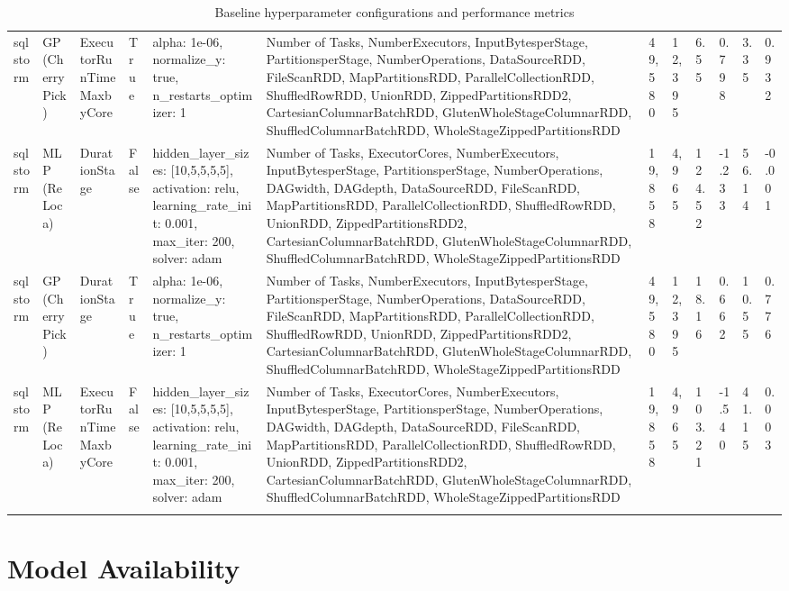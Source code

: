 \begin{landscape}
\begin{longtable}{@{}p{1.5cm}p{2cm}p{2.5cm}p{1cm}p{4cm}p{6cm}p{1.5cm}p{1.5cm}p{1.5cm}p{1.5cm}p{1.5cm}p{1.5cm}@{}}
\addlinespace
sqlstorm & GP (CherryPick) & ExecutorRunTimeMaxbyCore & True & alpha: 1e-06, normalize\_y: true, n\_restarts\_optimizer: 1 & Number of Tasks, NumberExecutors, InputBytesperStage, PartitionsperStage, NumberOperations, DataSourceRDD, FileScanRDD, MapPartitionsRDD, ParallelCollectionRDD, ShuffledRowRDD, UnionRDD, ZippedPartitionsRDD2, CartesianColumnarBatchRDD, GlutenWholeStageColumnarRDD, ShuffledColumnarBatchRDD, WholeStageZippedPartitionsRDD & 49,580 & 12,395 & 6.55 & 0.798 & 3.35 & 0.932 \\
\addlinespace
sqlstorm & MLP (ReLoca) & DurationStage & False & hidden\_layer\_sizes: [10,5,5,5,5], activation: relu, learning\_rate\_init: 0.001, max\_iter: 200, solver: adam & Number of Tasks, ExecutorCores, NumberExecutors, InputBytesperStage, PartitionsperStage, NumberOperations, DAGwidth, DAGdepth, DataSourceRDD, FileScanRDD, MapPartitionsRDD, ParallelCollectionRDD, ShuffledRowRDD, UnionRDD, ZippedPartitionsRDD2, CartesianColumnarBatchRDD, GlutenWholeStageColumnarRDD, ShuffledColumnarBatchRDD, WholeStageZippedPartitionsRDD & 19,858 & 4,965 & 124.52 & -1.233 & 56.14 & -0.001 \\
\addlinespace
sqlstorm & GP (CherryPick) & DurationStage & True & alpha: 1e-06, normalize\_y: true, n\_restarts\_optimizer: 1 & Number of Tasks, NumberExecutors, InputBytesperStage, PartitionsperStage, NumberOperations, DataSourceRDD, FileScanRDD, MapPartitionsRDD, ParallelCollectionRDD, ShuffledRowRDD, UnionRDD, ZippedPartitionsRDD2, CartesianColumnarBatchRDD, GlutenWholeStageColumnarRDD, ShuffledColumnarBatchRDD, WholeStageZippedPartitionsRDD & 49,580 & 12,395 & 18.16 & 0.662 & 10.55 & 0.776 \\
\addlinespace
sqlstorm & MLP (ReLoca) & ExecutorRunTimeMaxbyCore & False & hidden\_layer\_sizes: [10,5,5,5,5], activation: relu, learning\_rate\_init: 0.001, max\_iter: 200, solver: adam & Number of Tasks, ExecutorCores, NumberExecutors, InputBytesperStage, PartitionsperStage, NumberOperations, DAGwidth, DAGdepth, DataSourceRDD, FileScanRDD, MapPartitionsRDD, ParallelCollectionRDD, ShuffledRowRDD, UnionRDD, ZippedPartitionsRDD2, CartesianColumnarBatchRDD, GlutenWholeStageColumnarRDD, ShuffledColumnarBatchRDD, WholeStageZippedPartitionsRDD & 19,858 & 4,965 & 103.21 & -1.540 & 41.15 & 0.003 \\
\bottomrule
\caption{Baseline hyperparameter configurations and performance metrics}
\end{longtable}
\end{landscape}

\section{Model Availability}

